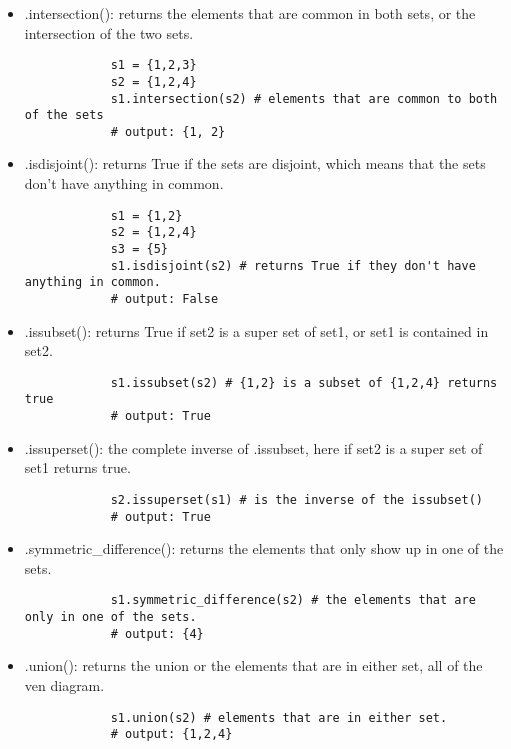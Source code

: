 \begin{itemize}
    \item {}.intersection(): returns the elements that are common in both sets, or the intersection of the two sets. 
        \begin{verbatim}
            s1 = {1,2,3}
            s2 = {1,2,4}
            s1.intersection(s2) # elements that are common to both of the sets
            # output: {1, 2}
        \end{verbatim}
        
    \item {}.isdisjoint(): returns True if the sets are disjoint, which means that the sets don't have anything in common. 
        \begin{verbatim}
            s1 = {1,2}
            s2 = {1,2,4}
            s3 = {5}
            s1.isdisjoint(s2) # returns True if they don't have anything in common. 
            # output: False
        \end{verbatim}
        
    \item {}.issubset(): returns True if set2 is a super set of set1, or set1 is contained in set2.
        \begin{verbatim}
            s1.issubset(s2) # {1,2} is a subset of {1,2,4} returns true
            # output: True
        \end{verbatim}
        
    \item {}.issuperset(): the complete inverse of .issubset, here if set2 is a super set of set1 returns true.
        \begin{verbatim}
            s2.issuperset(s1) # is the inverse of the issubset()
            # output: True
        \end{verbatim}
        
    \item {}.symmetric\_difference(): returns the elements that only show up in one of the sets.
        \begin{verbatim}
            s1.symmetric_difference(s2) # the elements that are only in one of the sets.
            # output: {4}
        \end{verbatim}
        
    \item {}.union(): returns the union or the elements that are in either set, all of the ven diagram. 
        \begin{verbatim}
            s1.union(s2) # elements that are in either set. 
            # output: {1,2,4}
        \end{verbatim}
        

\end{itemize}
